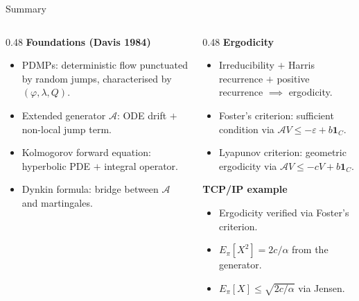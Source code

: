 \documentclass[aspectratio=169]{beamer}
\begin{document}
\begin{frame}{Summary}

  \begin{columns}[T]
    \begin{column}{0.48\textwidth}
      \textbf{Foundations (Davis 1984)}
      \begin{itemize}
        \setlength\itemsep{6pt}
        \item PDMPs: deterministic flow punctuated by
              random jumps, characterised by $(\varphi, \lambda, Q)$.
        \item Extended generator $\mathcal{A}$: ODE drift
              $+$ non-local jump term.
        \item Kolmogorov forward equation: hyperbolic PDE
              $+$ integral operator.
        \item Dynkin formula: bridge between $\mathcal{A}$
              and martingales.
      \end{itemize}
    \end{column}

    \begin{column}{0.48\textwidth}
      \textbf{Ergodicity}
      \begin{itemize}
        \setlength\itemsep{6pt}
        \item Irreducibility $+$ Harris recurrence $+$
              positive recurrence $\implies$ ergodicity.
        \item Foster's criterion: sufficient condition
              via $\mathcal{A}V \leq -\varepsilon + b\mathbf{1}_C$.
        \item Lyapunov criterion: geometric ergodicity
              via $\mathcal{A}V \leq -cV + b\mathbf{1}_C$.
      \end{itemize}

      \bigskip
      \textbf{TCP/IP example}
      \begin{itemize}
        \setlength\itemsep{6pt}
        \item Ergodicity verified via Foster's criterion.
        \item $E_\pi[X^2] = 2c/\alpha$ from the generator.
        \item $E_\pi[X] \leq \sqrt{2c/\alpha}$ via Jensen.
      \end{itemize}
    \end{column}
  \end{columns}

\end{frame}
\end{document}
